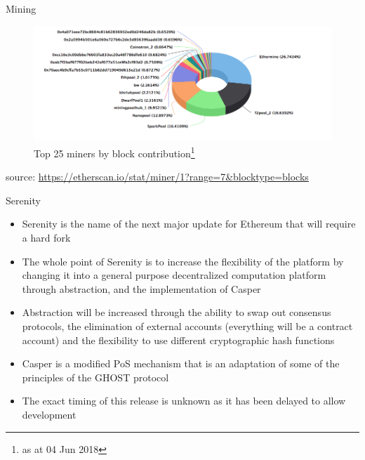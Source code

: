 \documentclass[11pt]{beamer}
\begin{document}

\begin{frame}{Mining}
	\begin{figure}[]
		\centering
		\includegraphics  [scale=0.25]{Images/eth-miners}
		\caption{Top 25 miners by block contribution\footnote{as at 04 Jun 2018}}
	\end{figure}
	\begin{scriptsize}
		source: \href{https://etherscan.io/stat/miner/1?range=7\&blocktype=blocks}{https://etherscan.io/stat/miner/1?range=7\&blocktype=blocks}
	\end{scriptsize}
\end{frame}


\begin{frame}{Serenity}
	\begin{itemize}
		\item Serenity is the name of the next major update for Ethereum that will require a hard fork
		\item The whole point of Serenity is to increase the flexibility of the platform by changing it into a general purpose decentralized computation platform through abstraction, and the implementation of Casper
		\item Abstraction will be increased through the ability to swap out consensus protocols, the elimination of external accounts (everything will be a contract account) and the flexibility to use different cryptographic hash functions
		\item Casper is a modified PoS mechanism that is an adaptation of some of the principles of the GHOST protocol
		\item The exact timing of this release is unknown as it has been delayed to allow development
	\end{itemize}
\end{frame}
\end{document}
